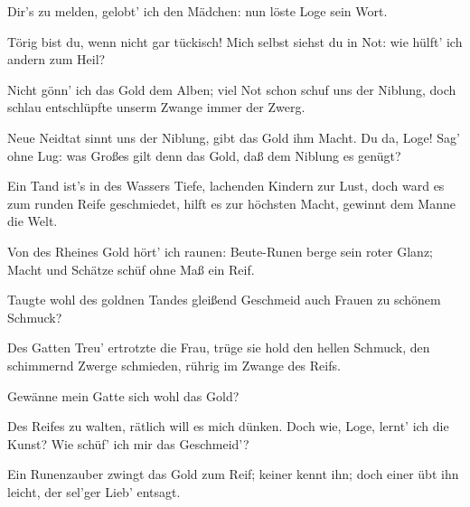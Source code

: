 \begin{drama}

Dir's zu melden, gelobt' ich den Mädchen:
nun löste Loge sein Wort.
 

\Wotanspeaks
Törig bist du, wenn nicht gar tückisch!
Mich selbst siehst du in Not:
wie hülft' ich andern zum Heil?
 

\Fasoltspeaks


Nicht gönn' ich das Gold dem Alben;
viel Not schon schuf uns der Niblung,
doch schlau entschlüpfte unserm
Zwange immer der Zwerg.
 

\Fafnerspeaks
Neue Neidtat sinnt uns der Niblung,
gibt das Gold ihm Macht.
Du da, Loge! Sag' ohne Lug:
was Großes gilt denn das Gold,
daß dem Niblung es genügt?
 

\Logespeaks
Ein Tand ist's in des Wassers Tiefe,
lachenden Kindern zur Lust,
doch ward es zum runden Reife geschmiedet,
hilft es zur höchsten Macht,
gewinnt dem Manne die Welt.
 

\Wotanspeaks


Von des Rheines Gold hört' ich raunen:
Beute-Runen berge sein roter Glanz;
Macht und Schätze schüf ohne Maß ein Reif.
 

\Frickaspeaks


Taugte wohl des goldnen Tandes
gleißend Geschmeid
auch Frauen zu schönem Schmuck?
 

\Logespeaks
Des Gatten Treu' ertrotzte die Frau,
trüge sie hold den hellen Schmuck,
den schimmernd Zwerge schmieden,
rührig im Zwange des Reifs.
 

\Frickaspeaks


Gewänne mein Gatte sich wohl das Gold?
 

\Wotanspeaks


Des Reifes zu walten,
rätlich will es mich dünken.
Doch wie, Loge, lernt' ich die Kunst?
Wie schüf' ich mir das Geschmeid'?
 

\Logespeaks
Ein Runenzauber zwingt das Gold zum Reif;
keiner kennt ihn;
doch einer übt ihn leicht,
der sel'ger Lieb' entsagt.
 




\end{drama}
